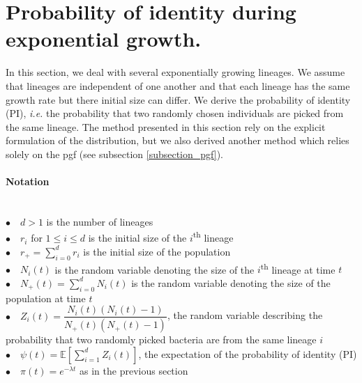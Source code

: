 \documentclass{article}
\begin{document}
\section{Probability of identity during exponential growth.}
\label{section_PI}
 In this section, we deal with several exponentially growing lineages. We assume that lineages are independent of one another and that each lineage has the same growth rate but there initial size can differ. We derive the probability of identity (PI), \textit{i.e.} the probability that two randomly chosen individuals are picked from the same lineage. The method presented in this section rely on the explicit formulation of the distribution, but we also derived another method which relies solely on the pgf (see subsection \ref{subsection_pgf}).
 \\
  \paragraph{Notation} $ $\\
 $\bullet \quad d>1$ is the number of lineages\\
 $\bullet \quad r_i $ for $1 \leq i \leq d$ is the initial size of the $i$\textsuperscript{th} lineage\\
 $\displaystyle \bullet \quad r_+=\sum_{i=0}^d r_i$ is the initial size of the population \\
 $\bullet \quad N_i(t) $ is the random variable denoting the size of the $i$\textsuperscript{th} lineage at time $t$ \\
 $\displaystyle \bullet \quad N_+(t)=\sum_{i=0}^d N_i(t)$ is the random variable denoting the size of the population at time $t$ \\
 $\bullet \quad Z_i(t)=\dfrac{N_i(t)(N_i(t)-1)}{N_+(t)( N_+(t)-1 ) }$, the random variable describing the probability that two randomly picked bacteria are from the same lineage $i$\\
 $\bullet \quad \psi(t)=\mathbb{E}[\sum_{i=1}^d Z_i(t)]$, the expectation of the probability of identity (PI)\\
 $\bullet \quad \pi(t)=e^{-\lambda t} $ as in the previous section\\
 
 
 
\end{document}
